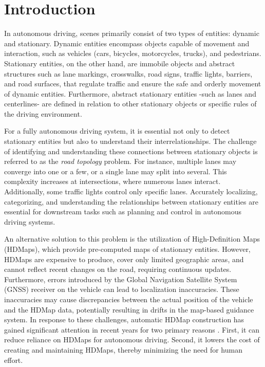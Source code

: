 \section{Introduction}
In autonomous driving, scenes primarily consist of two types of entities: dynamic and stationary. Dynamic entities encompass objects capable of movement and interaction, such as vehicles (cars, bicycles, motorcycles, trucks), and pedestrians. Stationary entities, on the other hand, are immobile objects and abstract structures such as lane markings, crosswalks, road signs, traffic lights, barriers, and road surfaces, that regulate traffic and ensure the safe and orderly movement of dynamic entities. Furthermore, abstract stationary entities -such as lanes and centerlines- are defined in relation to other stationary objects or specific rules of the driving environment.

For a fully autonomous driving system, it is essential not only to detect stationary entities but also to understand their interrelationships. The challenge of identifying and understanding these connections between stationary objects is referred to as the \textit{road topology} problem. For instance, multiple lanes may converge into one or a few, or a single lane may split into several. This complexity increases at intersections, where numerous lanes interact. Additionally, some traffic lights control only specific lanes. Accurately localizing, categorizing, and understanding the relationships between stationary entities are essential for downstream tasks such as planning and control in autonomous driving systems.

An alternative solution to this problem is the utilization of High-Definition Maps (HDMaps), which provide pre-computed maps of stationary entities. However, HDMaps are expensive to produce, cover only limited geographic areas, and cannot reflect recent changes on the road, requiring continuous updates. Furthermore, errors introduced by the Global Navigation Satellite System (GNSS) receiver on the vehicle can lead to localization inaccuracies. These inaccuracies may cause discrepancies between the actual position of the vehicle and the HDMap data, potentially resulting in drifts in the map-based guidance system. In response to these challenges, automatic HDMap construction has gained significant attention in recent years for two primary reasons \cite{li2022hdmapnet, liu2023vectormapnet, liao2022maptr, can2021structured}. First, it can reduce reliance on HDMaps for autonomous driving. Second, it lowers the cost of creating and maintaining HDMaps, thereby minimizing the need for human effort.

